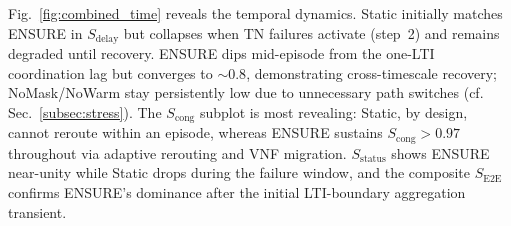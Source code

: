 \documentclass[12pt,lettersize,journal,onecolumn]{IEEEtran}
\begin{document}
Fig.~\ref{fig:combined_time} reveals the temporal dynamics. Static initially matches ENSURE in $S_{\mathrm{delay}}$ but collapses when TN failures activate (step~2) and remains degraded until recovery. ENSURE dips mid-episode from the one-LTI coordination lag but converges to ${\sim}0.8$, demonstrating cross-timescale recovery; NoMask/NoWarm stay persistently low due to unnecessary path switches (cf. Sec.~\ref{subsec:stress}). The $S_{\mathrm{cong}}$ subplot is most revealing: Static, by design, cannot reroute within an episode, whereas ENSURE sustains $S_{\mathrm{cong}}>0.97$ throughout via adaptive rerouting and VNF migration. $S_{\mathrm{status}}$ shows ENSURE near-unity while Static drops during the failure window, and the composite $S_{\mathrm{E2E}}$ confirms ENSURE's dominance after the initial LTI-boundary aggregation transient.
\end{document}
